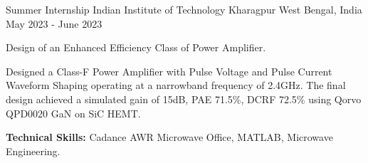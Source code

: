 

\begin{cventries}

  \cventry
    {Summer Internship} %
    {Indian Institute of Technology Kharagpur} %
    {West Bengal, India} %
    {May 2023 - June 2023} %
    {
      \begin{cvitems} %
        \item {Design of an Enhanced Efficiency Class of Power Amplifier.}
        \item {Designed a Class-F Power Amplifier with Pulse Voltage and Pulse Current Waveform Shaping operating at a narrowband frequency of 2.4GHz. The final design achieved a simulated gain of 15dB, PAE 71.5\%, DCRF 72.5\% using Qorvo QPD0020 GaN on SiC HEMT.}
        \item {\textbf{Technical Skills:} Cadance AWR Microwave Office, MATLAB, Microwave Engineering.}
      \end{cvitems}
    }


\end{cventries}
